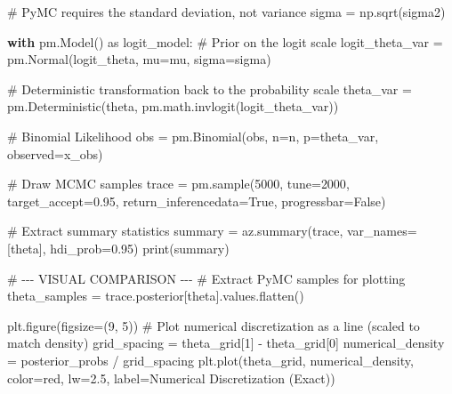 \documentclass[
  letterpaper,
  DIV=11,
  numbers=noendperiod]{scrartcl}
\newenvironment{Shaded}{\begin{snugshade}}{\end{snugshade}}
\newcommand{\BuiltInTok}[1]{\textcolor[rgb]{0.00,0.23,0.31}{#1}}
\newcommand{\CommentTok}[1]{\textcolor[rgb]{0.37,0.37,0.37}{#1}}
\newcommand{\ControlFlowTok}[1]{\textcolor[rgb]{0.00,0.23,0.31}{\textbf{#1}}}
\newcommand{\DecValTok}[1]{\textcolor[rgb]{0.68,0.00,0.00}{#1}}
\newcommand{\FloatTok}[1]{\textcolor[rgb]{0.68,0.00,0.00}{#1}}
\newcommand{\ImportTok}[1]{\textcolor[rgb]{0.00,0.46,0.62}{#1}}
\newcommand{\NormalTok}[1]{\textcolor[rgb]{0.00,0.23,0.31}{#1}}
\newcommand{\OperatorTok}[1]{\textcolor[rgb]{0.37,0.37,0.37}{#1}}
\newcommand{\StringTok}[1]{\textcolor[rgb]{0.13,0.47,0.30}{#1}}
\newcommand{\VariableTok}[1]{\textcolor[rgb]{0.07,0.07,0.07}{#1}}
\begin{document}
\begin{Shaded}
\begin{Highlighting}[]
\CommentTok{\# PyMC requires the standard deviation, not variance}
\NormalTok{sigma }\OperatorTok{=}\NormalTok{ np.sqrt(sigma2)}

\ControlFlowTok{with}\NormalTok{ pm.Model() }\ImportTok{as}\NormalTok{ logit\_model:}
    \CommentTok{\# Prior on the logit scale}
\NormalTok{    logit\_theta\_var }\OperatorTok{=}\NormalTok{ pm.Normal(}\StringTok{\textquotesingle{}logit\_theta\textquotesingle{}}\NormalTok{, mu}\OperatorTok{=}\NormalTok{mu, sigma}\OperatorTok{=}\NormalTok{sigma)}
    
    \CommentTok{\# Deterministic transformation back to the probability scale}
\NormalTok{    theta\_var }\OperatorTok{=}\NormalTok{ pm.Deterministic(}\StringTok{\textquotesingle{}theta\textquotesingle{}}\NormalTok{, pm.math.invlogit(logit\_theta\_var))}
    
    \CommentTok{\# Binomial Likelihood}
\NormalTok{    obs }\OperatorTok{=}\NormalTok{ pm.Binomial(}\StringTok{\textquotesingle{}obs\textquotesingle{}}\NormalTok{, n}\OperatorTok{=}\NormalTok{n, p}\OperatorTok{=}\NormalTok{theta\_var, observed}\OperatorTok{=}\NormalTok{x\_obs)}
    
    \CommentTok{\# Draw MCMC samples}
\NormalTok{    trace }\OperatorTok{=}\NormalTok{ pm.sample(}\DecValTok{5000}\NormalTok{, tune}\OperatorTok{=}\DecValTok{2000}\NormalTok{, target\_accept}\OperatorTok{=}\FloatTok{0.95}\NormalTok{, return\_inferencedata}\OperatorTok{=}\VariableTok{True}\NormalTok{, progressbar}\OperatorTok{=}\VariableTok{False}\NormalTok{)}

\CommentTok{\# Extract summary statistics}
\NormalTok{summary }\OperatorTok{=}\NormalTok{ az.summary(trace, var\_names}\OperatorTok{=}\NormalTok{[}\StringTok{\textquotesingle{}theta\textquotesingle{}}\NormalTok{], hdi\_prob}\OperatorTok{=}\FloatTok{0.95}\NormalTok{)}
\BuiltInTok{print}\NormalTok{(summary)}

\CommentTok{\# {-}{-}{-} VISUAL COMPARISON {-}{-}{-}}
\CommentTok{\# Extract PyMC samples for plotting}
\NormalTok{theta\_samples }\OperatorTok{=}\NormalTok{ trace.posterior[}\StringTok{\textquotesingle{}theta\textquotesingle{}}\NormalTok{].values.flatten()}

\NormalTok{plt.figure(figsize}\OperatorTok{=}\NormalTok{(}\DecValTok{9}\NormalTok{, }\DecValTok{5}\NormalTok{))}
\CommentTok{\# Plot numerical discretization as a line (scaled to match density)}
\NormalTok{grid\_spacing }\OperatorTok{=}\NormalTok{ theta\_grid[}\DecValTok{1}\NormalTok{] }\OperatorTok{{-}}\NormalTok{ theta\_grid[}\DecValTok{0}\NormalTok{]}
\NormalTok{numerical\_density }\OperatorTok{=}\NormalTok{ posterior\_probs }\OperatorTok{/}\NormalTok{ grid\_spacing}
\NormalTok{plt.plot(theta\_grid, numerical\_density, color}\OperatorTok{=}\StringTok{\textquotesingle{}red\textquotesingle{}}\NormalTok{, lw}\OperatorTok{=}\FloatTok{2.5}\NormalTok{, label}\OperatorTok{=}\StringTok{\textquotesingle{}Numerical Discretization (Exact)\textquotesingle{}}\NormalTok{)}


\end{Highlighting}
\end{Shaded}
\end{document}
